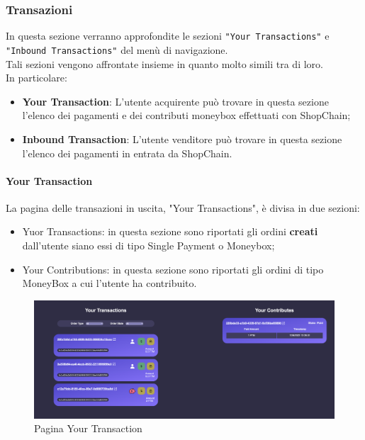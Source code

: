         \subsubsection{Transazioni}
        In questa sezione verranno approfondite le sezioni \texttt{"Your Transactions"} e \texttt{"Inbound Transactions"} del menù di navigazione.\\
        Tali sezioni vengono affrontate insieme in quanto molto simili tra di loro.\\
        In particolare:
        \begin{itemize}
            \item \textbf{Your Transaction}: L'utente acquirente può trovare in questa sezione l'elenco dei pagamenti e dei contributi moneybox effettuati con ShopChain;
            \item \textbf{Inbound Transaction}: L'utente venditore può trovare in questa sezione l'elenco dei pagamenti in entrata da ShopChain.
        \end{itemize}
        \paragraph{Your Transaction}
        La pagina delle transazioni in uscita, "Your Transactions", è divisa in due sezioni:
        \begin{itemize}
            \item Yuor Transactions: in questa sezione sono riportati gli ordini \textbf{creati} dall'utente siano essi di tipo Single Payment o Moneybox;
            \item Your Contributions: in questa sezione sono riportati gli ordini di tipo MoneyBox a cui l'utente ha contribuito.
        \end{itemize}
        \begin{figure}[H]
        \centering
        \includegraphics[scale=0.2]{immagini/Transaction/YourTransaction.png}
        \caption{Pagina Your Transaction}
        \end{figure}
